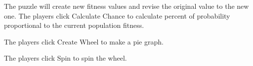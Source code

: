\documentclass[12pt,oneside,openright,a4paper]{cpe-english-project}
\begin{document}
\begin{itemize}
\begin{enumerate}
		The puzzle will create new fitness values and revise the original value to the new one. The players click Calculate Chance to calculate percent of probability proportional to the current population fitness. \\
		\begin{minipage}[c]{\textwidth}\centering {}  \end{minipage}
		The players click Create Wheel to make a pie graph. \\
		\begin{minipage}[c]{\textwidth}\centering {}  \end{minipage}
		The players click Spin to spin the wheel. \\
		\begin{minipage}[c]{\textwidth}\centering {}  \end{minipage}

\end{enumerate}
\end{itemize}
\end{document}
